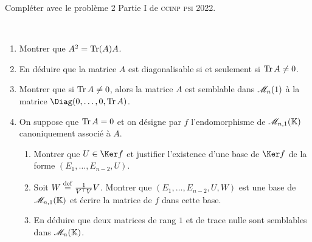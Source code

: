 Compléter avec le problème 2 Partie I de \textsc{ccinp} \textsc{psi} 2022.

\begin{exercice}
     \\
    \begin{enumerate}
        \item Montrer que $A^2 = \Tr (A) A$.
        \item En déduire que la matrice $A$ est diagonalisable si et seulement si $\Tr A \not= 0$.
        \item Montrer que si $\Tr A \not= 0$, alors la matrice $A$ est semblable dans $\mathscr{M}_n(1)$ à la matrice $\Diag(0, \dots, 0, \Tr A)$.
        \item On suppose que $\Tr A = 0$ et on désigne par $f$ l'endomorphisme de $\mathscr{M}_{n,1}(\mathbb{K})$ canoniquement associé à $A$. 
        \begin{enumerate}
            \item Montrer que $U \in \Ker f$ et justifier l'existence d'une base de $\Ker f$ de la forme $(E_1, \dots, E_{n-2}, U)$. 
            \item Soit $W \overset{\mathrm{\tiny def}}{=} \frac{1}{V^\top V}V$. Montrer que $(E_1, \dots, E_{n-2}, U, W)$ est une base de $\mathscr{M}_{n,1}(\mathbb{K})$ et écrire la matrice de $f$ dans cette base. 
            \item En déduire que deux matrices de rang $1$ et de trace nulle sont semblables dans $\mathscr{M}_n(\mathbb{K})$.
        \end{enumerate}
    \end{enumerate}
\end{exercice}

\begin{solution}
    
\end{solution}